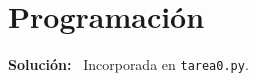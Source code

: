 \documentclass[11pt,letterpaper]{article}
\newenvironment{solution}{%
  \noindent\begin{shaded}
  \textbf{Solución:}\ }{
  \end{shaded}%
}
\begin{document}

\section*{Programación}

\begin{solution}
  Incorporada en \texttt{tarea0.py}.
\end{solution}
\end{document}
